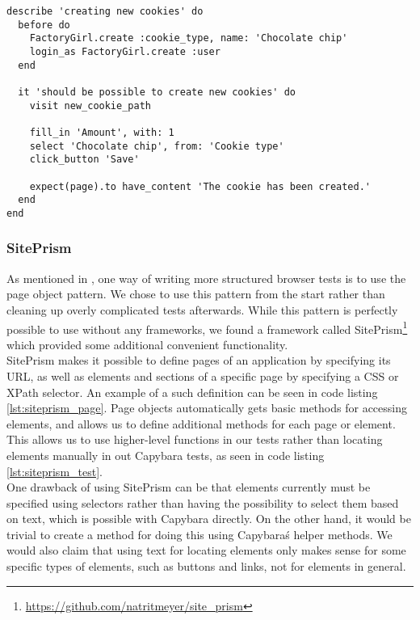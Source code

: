 \begin{lstlisting}[caption=A browser test written in RSpec using Capybara.,
                   label=lst:capybara, float=t]
describe 'creating new cookies' do
  before do
    FactoryGirl.create :cookie_type, name: 'Chocolate chip'
    login_as FactoryGirl.create :user
  end

  it 'should be possible to create new cookies' do
    visit new_cookie_path

    fill_in 'Amount', with: 1
    select 'Chocolate chip', from: 'Cookie type'
    click_button 'Save'

    expect(page).to have_content 'The cookie has been created.'
  end
end
\end{lstlisting}


\subsubsection{SitePrism}

As mentioned in , one way of writing more
structured browser tests is to use the page object pattern. We chose to
use this pattern from the start rather than cleaning up overly
complicated tests afterwards. While this pattern is perfectly possible
to use without any frameworks, we found a framework called
SitePrism\footnote{\url{https://github.com/natritmeyer/site_prism}}
which provided some additional convenient functionality.\\

SitePrism makes it possible to define pages of an application by
specifying its URL, as well as elements and sections of a specific page
by specifying a CSS or XPath selector. An example of a such definition
can be seen in code listing \ref{lst:siteprism_page}. Page objects
automatically gets basic methods for accessing elements, and allows us
to define additional methods for each page or element. This allows us to
use higher-level functions in our tests rather than locating elements
manually in out Capybara tests, as seen in code listing
\ref{lst:siteprism_test}.\\

One drawback of using SitePrism can be that elements currently must be
specified using selectors rather than having the possibility to select
them based on text, which is possible with Capybara directly. On the
other hand, it would be trivial to create a method for doing this using
Capybara\'s helper methods. We would also claim that using text
for locating elements only makes sense for some specific types of
elements, such as buttons and links, not for elements in general.\\

